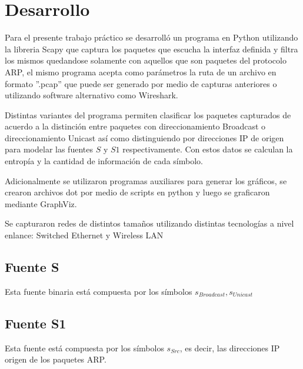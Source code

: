 \section{Desarrollo}

Para el presente trabajo práctico se desarrolló un programa en Python utilizando la libreria Scapy que captura los paquetes que escucha la interfaz definida y filtra los mismos quedandose solamente con aquellos que son paquetes del protocolo ARP, el mismo programa acepta como parámetros la ruta de un archivo en formato ''.pcap'' que puede ser generado por medio de capturas anteriores o utilizando software alternativo como Wireshark.

Distintas variantes del programa permiten clasificar los paquetes capturados de acuerdo a la distinción entre paquetes con direccionamiento Broadcast o direccionamiento Unicast así como distinguiendo por direcciones IP de origen para modelar las fuentes $S$ y $S1$ respectivamente. Con estos datos se calculan la entropía y la cantidad de información de cada símbolo.

Adicionalmente se utilizaron programas auxiliares para generar los gráficos, se crearon archivos dot por medio de scripts en python y luego se graficaron mediante GraphViz.

Se capturaron redes de distintos tamaños utilizando distintas tecnologías a nivel enlance: Switched Ethernet y Wireless LAN


\subsection{Fuente S}
Esta fuente binaria está compuesta por los símbolos ${s_{Broadcast}, s_{Unicast}}$

\subsection{Fuente S1}

Esta fuente está compuesta por los símbolos $s_{Src}$, es decir, las direcciones IP origen de los paquetes ARP.